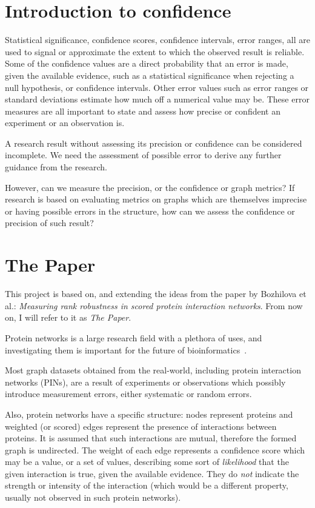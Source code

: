 \section{Introduction to confidence}

Statistical significance, confidence scores, confidence intervals, error ranges, all are used to signal or approximate the extent to which the observed result is reliable.
Some of the confidence values are a direct probability that an error is made, given the available evidence, such as a statistical significance when rejecting a null hypothesis, or confidence intervals.
Other error values such as error ranges or standard deviations estimate how much off a numerical value may be.
These error measures are all important to state and assess how precise or confident an experiment or an observation is.

A research result without assessing its precision or confidence can be considered incomplete.
We need the assessment of possible error to derive any further guidance from the research.

However, can we measure the precision, or the confidence or graph metrics?
If research is based on evaluating metrics on graphs which are themselves imprecise or having possible errors in the structure, how can we assess the confidence or precision of such result?


\section{The Paper}

This project is based on, and extending the ideas from the paper by Bozhilova et al.: \textsl{Measuring rank robustness in scored protein interaction networks}\cite{Bozhilova2019}.
From now on, I will refer to it as \textsl{The Paper}.

Protein networks is a large research field with a plethora of uses, and investigating them is important for the future of bioinformatics~.

Most graph datasets obtained from the real-world, including protein interaction networks (PINs), are a result of experiments or observations which possibly introduce measurement errors, either systematic or random errors.

Also, protein networks have a specific structure: nodes represent proteins and weighted (or scored) edges represent the presence of interactions between proteins.
It is assumed that such interactions are mutual, therefore the formed graph is undirected.
The weight of each edge represents a confidence score which may be a value, or a set of values, describing some sort of \textsl{likelihood} that the given interaction is true, given the available evidence.
They do \textsl{not} indicate the strength or intensity of the interaction (which would be a different property, usually not observed in such protein networks).

